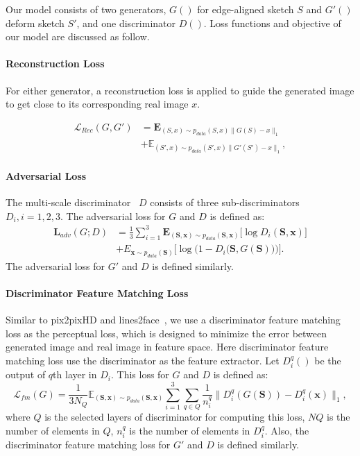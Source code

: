 
Our model consists of two generators, $G()$ for edge-aligned sketch $S$ and $G'()$ deform sketch $S'$, and one discriminator $D()$. Loss functions and objective of our model are discussed as follow.

\paragraph{Reconstruction Loss}
For either generator, a reconstruction loss is applied to guide the generated image to get close to its corresponding real image $x$.

\begin{equation}
\label{eqn:loss_rec}
\begin{aligned}
\mathcal{L}_{Rec}(G, G') &=\textbf{E}_{(S, x)\sim p_{data}(S,x)\|G(S) - x\|_1} \\
&+ \mathbb{E}_{(S', x)\sim p_{data}(S',x)\|G'(S') - x\|_1},
\end{aligned}
\end{equation}

\paragraph{Adversarial Loss}
The multi-scale discriminator~\cite{pix2pixHD} $D$ consists of three sub-discriminators $D_i, i=1,2,3$.  The adversarial loss for $G$ and $D$ is defined as:
\begin{equation}
\label{eqn:new_loss_adv}
\begin{aligned}
\textbf{L}_{adv}(G;D) &=\frac{1}{3}\sum_{i=1}^{3}\textbf{E}_{(\bm{S},\bm{x})\sim p_{data}(\bm{S},\bm{x})}\big[\log D_i(\bm{S},\bm{x})\big] \\
& + E_{\bm{x}\sim p_{data}(\bm{S})}\Big[\log \Big(1-D_i \big(\bm{S},G(\bm{S})\big)\Big)\Big].
\end{aligned}
\end{equation}
The adversarial loss for $G'$ and $D$ is defined similarly.

\paragraph{Discriminator Feature Matching Loss} Similar to pix2pixHD\cite{pix2pixHD} and lines2face~\cite{Lines2Face}, we use a discriminator feature matching loss as the perceptual loss, which is designed to minimize the error between generated image and real image in feature space. Here discriminator feature matching loss use the discriminator as the feature extractor. Let $D^q_i()$ be the output of $q$th layer in $D_i$. This loss for $G$ and $D$ is defined as:
\begin{equation}
\label{eqn:feature_matching_loss}
\mathcal{L}_{fm}(G)=\frac{1}{3N_Q}\mathbb{E}_{(\bm{S},\bm{x})\sim p_{data}(\bm{S},\bm{x})}\sum_{i=1}^{3}\sum_{q\in Q} \frac{1}{n_i^q} \|D^q_i(G(\bm{S}))-D^q_i(\bm{x})\|_1 ,
\end{equation}
where $Q$ is the selected layers of discriminator for computing this loss, $NQ$ is the number of elements in $Q$, $n^q_i$ is the number of elements in $D^q_i$.
Also, the discriminator feature matching loss for $G'$ and $D$ is defined similarly.

